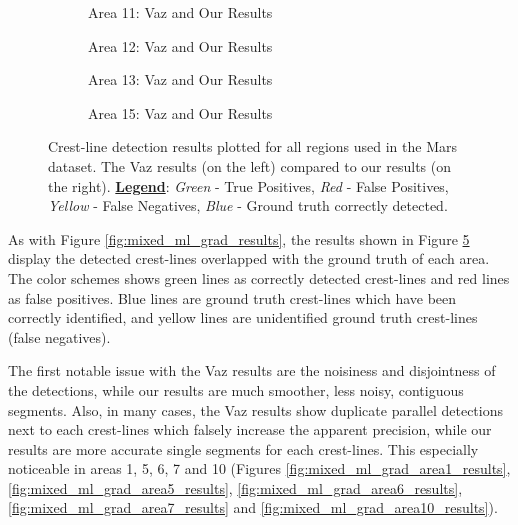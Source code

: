 \begin{figure}
	\ContinuedFloat
	\centering
	\begin{subfigure}{\textwidth}
		\centering
		\caption{ Area 11: Vaz \cite{vaz_object_based_dune_analysis} and Our Results }
		\label{fig:mixed_ml_grad_area11_results}
	\end{subfigure}
	\begin{subfigure}{\textwidth}
		\centering
		\caption{ Area 12: Vaz \cite{vaz_object_based_dune_analysis} and Our Results }
		\label{fig:mixed_ml_grad_area12_results}
	\end{subfigure}
	\begin{subfigure}{\textwidth}
		\centering
		\caption{ Area 13: Vaz \cite{vaz_object_based_dune_analysis} and Our Results }
		\label{fig:mixed_ml_grad_area13_results}
	\end{subfigure}
	\begin{subfigure}{\textwidth}
		\centering
		\caption{ Area 15: Vaz \cite{vaz_object_based_dune_analysis} and Our Results }
		\label{fig:mixed_ml_grad_area15_results}
	\end{subfigure}
	\caption{ Crest-line detection results plotted for all regions used in the Mars dataset. The Vaz \cite{vaz_object_based_dune_analysis} results (on the left) compared to our results (on the right). \underline{\textbf{Legend}}: \emph{Green} - True Positives, \emph{Red} - False Positives, \emph{Yellow} - False Negatives, \emph{Blue} - Ground truth correctly detected. }
	\label{fig:mixed_ml_grad_mars_results}
\end{figure}

As with Figure \ref{fig:mixed_ml_grad_results}, the results shown in Figure \ref{fig:mixed_ml_grad_mars_results} display the detected crest-lines overlapped with the ground truth of each area. The color schemes shows green lines as correctly detected crest-lines and red lines as false positives. Blue lines are ground truth crest-lines which have been correctly identified, and yellow lines are unidentified ground truth crest-lines (false negatives). 

The first notable issue with the Vaz results are the noisiness and disjointness of the detections, while our results are much smoother, less noisy, contiguous segments. Also, in many cases, the Vaz results show duplicate parallel detections next to each crest-lines which falsely increase the apparent precision, while our results are more accurate single segments for each crest-lines. This especially noticeable in areas 1, 5, 6, 7 and 10 (Figures \ref{fig:mixed_ml_grad_area1_results}, \ref{fig:mixed_ml_grad_area5_results}, \ref{fig:mixed_ml_grad_area6_results}, \ref{fig:mixed_ml_grad_area7_results} and \ref{fig:mixed_ml_grad_area10_results}).

